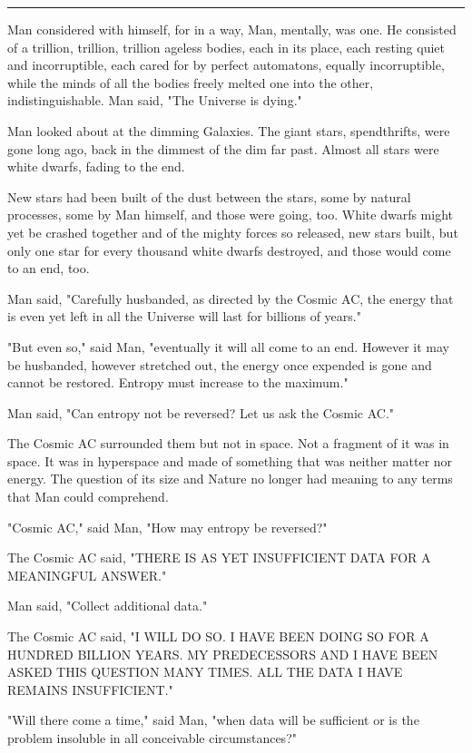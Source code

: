 \documentclass[11pt]{article}
\newcommand{\sep}[0]{\vspace{.5cm}\hrule\vspace{.5cm}}
\begin{document}
\sep{}

Man considered with himself, for in a way, Man, mentally, was one. He consisted of a trillion, trillion, trillion ageless bodies, each in its place, each resting quiet and incorruptible, each cared for by perfect automatons, equally incorruptible, while the minds of all the bodies freely melted one into the other, indistinguishable.
Man said, "The Universe is dying."

Man looked about at the dimming Galaxies. The giant stars, spendthrifts, were gone long ago, back in the dimmest of the dim far past. Almost all stars were white dwarfs, fading to the end.

New stars had been built of the dust between the stars, some by natural processes, some by Man himself, and those were going, too. White dwarfs might yet be crashed together and of the mighty forces so released, new stars built, but only one star for every thousand white dwarfs destroyed, and those would come to an end, too.

Man said, "Carefully husbanded, as directed by the Cosmic AC, the energy that is even yet left in all the Universe will last for billions of years."

"But even so," said Man, "eventually it will all come to an end. However it may be husbanded, however stretched out, the energy once expended is gone and cannot be restored. Entropy must increase to the maximum."

Man said, "Can entropy not be reversed? Let us ask the Cosmic AC."

The Cosmic AC surrounded them but not in space. Not a fragment of it was in space. It was in hyperspace and made of something that was neither matter nor energy. The question of its size and Nature no longer had meaning to any terms that Man could comprehend.

"Cosmic AC," said Man, "How may entropy be reversed?"

The Cosmic AC said, "THERE IS AS YET INSUFFICIENT DATA FOR A MEANINGFUL ANSWER."

Man said, "Collect additional data."

The Cosmic AC said, "I WILL DO SO. I HAVE BEEN DOING SO FOR A HUNDRED BILLION YEARS. MY PREDECESSORS AND I HAVE BEEN ASKED THIS QUESTION MANY TIMES. ALL THE DATA I HAVE REMAINS INSUFFICIENT."

"Will there come a time," said Man, "when data will be sufficient or is the problem insoluble in all conceivable circumstances?"
\end{document}

